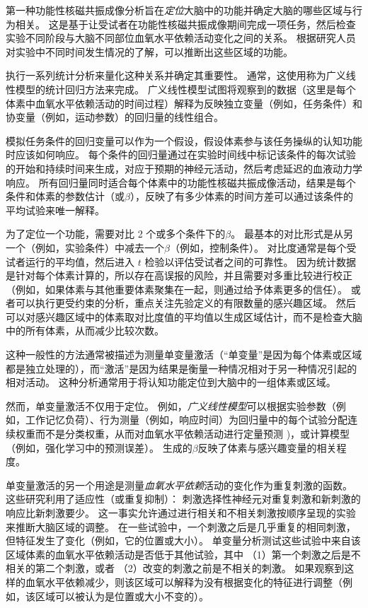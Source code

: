 第一种功能性核磁共振成像分析旨在\textit{定位}大脑中的功能并确定大脑的哪些区域与行为相关。
这是基于让受试者在功能性核磁共振成像期间完成一项任务，然后检查实验不同阶段与大脑不同部位血氧水平依赖活动变化之间的关系。
根据研究人员对实验中不同时间发生情况的了解，可以推断出这些区域的功能。


执行一系列统计分析来量化这种关系并确定其重要性。 
通常，这使用称为广义线性模型的统计回归方法来完成。
广义线性模型试图将观察到的数据（这里是每个体素中血氧水平依赖活动的时间过程）解释为反映独立变量（例如，任务条件）和协变量（例如，运动参数）的回归量的线性组合。


模拟任务条件的回归变量可以作为一个假设，假设体素参与该任务操纵的认知功能时应该如何响应。
每个条件的回归量通过在实验时间线中标记该条件的每次试验的开始和持续时间来生成，对应于预期的神经元活动，然后考虑延迟的血液动力学响应。
所有回归量同时适合每个体素中的功能性核磁共振成像活动，结果是每个条件和体素的参数估计（或$\beta$），反映了有多少体素的时间方差可以通过该条件的平均试验来唯一解释。


为了定位一个功能，需要对比 2 个或多个条件下的$\beta$。
最基本的对比形式是从另一个（例如，实验条件）中减去一个$\beta$（例如，控制条件）。 
对比度通常是每个受试者运行的平均值，然后进入 $t$ 检验以评估受试者之间的可靠性。 
因为统计数据是针对每个体素计算的，所以存在高误报的风险，并且需要对多重比较进行校正（例如，如果体素与其他重要体素聚集在一起，则通过给予体素更多的信任）。
或者可以执行更受约束的分析，重点关注先验定义的有限数量的感兴趣区域。
然后可以对感兴趣区域中的体素取对比度值的平均值以生成区域估计，而不是检查大脑中的所有体素，从而减少比较次数。


这种一般性的方法通常被描述为测量单变量激活（“单变量”是因为每个体素或区域都是独立处理的），而“激活”是因为结果是衡量一种情况相对于另一种情况引起的相对活动。
这种分析通常用于将认知功能定位到大脑中的一组体素或区域。


然而，单变量激活不仅用于定位。
例如，\textit{广义线性模型}可以根据实验参数（例如，工作记忆负荷）、行为测量（例如，响应时间）为回归量中的每个试验分配连续权重而不是分类权重，从而对血氧水平依赖活动进行定量预测 )，或计算模型（例如，强化学习中的预测误差）。
生成的$\beta$反映了体素与感兴趣变量的相关程度。


单变量激活的另一个用途是测量\textit{血氧水平依赖}活动的变化作为重复刺激的函数。
这些研究利用了适应性（或重复抑制）：
刺激选择性神经元对重复刺激和新刺激的响应比新刺激要少。
这一事实允许通过进行相关和不相关刺激按顺序呈现的实验来推断大脑区域的调整。
在一些试验中，一个刺激之后是几乎重复的相同刺激，但特征发生了变化（例如，它的位置或大小）。
单变量分析测试这些试验中来自该区域体素的血氧水平依赖活动是否低于其他试验，其中
（1）第一个刺激之后是不相关的第二个刺激，或者
（2）改变的刺激之前是不相关的刺激。
如果观察到这样的血氧水平依赖减少，则该区域可以解释为没有根据变化的特征进行调整（例如，该区域可以被认为是位置或大小不变的）。


